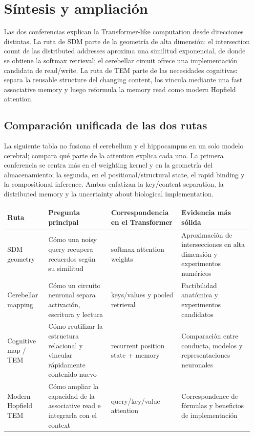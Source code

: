 \section{Síntesis y ampliación}

Las dos conferencias explican la Transformer-like computation desde direcciones distintas. La ruta de SDM parte de la geometría de alta dimensión: el intersection count de las distributed addresses aproxima una similitud exponencial, de donde se obtiene la softmax retrieval; el cerebellar circuit ofrece una implementación candidata de read/write. La ruta de TEM parte de las necesidades cognitivas: separa la reusable structure del changing content, los vincula mediante una fast associative memory y luego reformula la memory read como modern Hopfield attention.

\subsection{Comparación unificada de las dos rutas}

La siguiente tabla no fusiona el cerebellum y el hippocampus en un solo modelo cerebral; compara qué parte de la attention explica cada uno. La primera conferencia se centra más en el weighting kernel y en la geometría del almacenamiento; la segunda, en el positional/structural state, el rapid binding y la compositional inference. Ambas enfatizan la key/content separation, la distributed memory y la uncertainty about biological implementation.

\begin{longtable}{@{}L{0.18\textwidth}L{0.24\textwidth}L{0.25\textwidth}L{0.21\textwidth}@{}}
\toprule
Ruta & Pregunta principal & Correspondencia en el Transformer & Evidencia más sólida \\
\midrule
SDM geometry & Cómo una noisy query recupera recuerdos según su similitud & softmax attention weights & Aproximación de intersecciones en alta dimensión y experimentos numéricos \\
Cerebellar mapping & Cómo un circuito neuronal separa activación, escritura y lectura & keys/values y pooled retrieval & Factibilidad anatómica y experimentos candidatos \\
Cognitive map / TEM & Cómo reutilizar la estructura relacional y vincular rápidamente contenido nuevo & recurrent position state + memory & Comparación entre conducta, modelos y representaciones neuronales \\
Modern Hopfield TEM & Cómo ampliar la capacidad de la associative read e integrarla con el context & query/key/value attention & Correspondence de fórmulas y beneficios de implementación \\
\bottomrule
\end{longtable}


